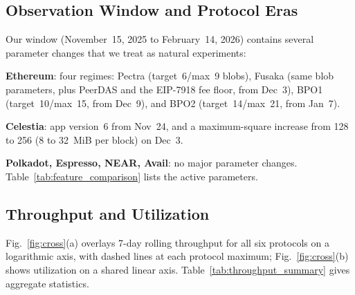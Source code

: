 
\subsection{Observation Window and Protocol Eras}
\label{sec:results-eras}

Our window (November~15, 2025 to February~14, 2026) contains several parameter changes that we treat as natural experiments:
\squishlist
    \item \textbf{Ethereum}: four regimes: Pectra (target~6/max~9 blobs), Fusaka (same blob parameters, plus PeerDAS and the EIP-7918 fee floor, from Dec~3), BPO1 (target~10/max~15, from Dec~9), and BPO2 (target~14/max~21, from Jan~7).
    \item \textbf{Celestia}: app version~6 from Nov~24, and a maximum-square increase from 128 to 256 (8 to 32~MiB per block) on Dec~3.
    \item \textbf{Polkadot, Espresso, NEAR, Avail}: no major parameter changes.
\squishend
Table~\ref{tab:feature_comparison} lists the active parameters.

\subsection{Throughput and Utilization}
\label{sec:results-throughput}

Fig.~\ref{fig:cross}(a) overlays 7-day rolling throughput for all six protocols on a logarithmic axis, with dashed lines at each protocol maximum; Fig.~\ref{fig:cross}(b) shows utilization on a shared linear axis.
Table~\ref{tab:throughput_summary} gives aggregate statistics.

